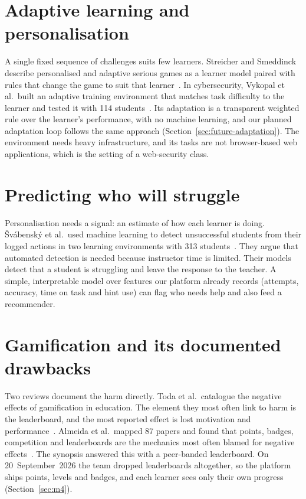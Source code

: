 \section{Adaptive learning and personalisation}

A single fixed sequence of challenges suits few learners. Streicher and Smeddinck describe personalised and adaptive serious games as a learner model paired with rules that change the game to suit that learner~\cite{Streicher2016adaptive}. In cybersecurity, Vykopal et al.\ built an adaptive training environment that matches task difficulty to the learner and tested it with 114 students~\cite{Vykopal2023smart}. Its adaptation is a transparent weighted rule over the learner's performance, with no machine learning, and our planned adaptation loop follows the same approach (Section~\ref{sec:future-adaptation}). The environment needs heavy infrastructure, and its tasks are not browser-based web applications, which is the setting of a web-security class.

\section{Predicting who will struggle}

Personalisation needs a signal: an estimate of how each learner is doing. Švábenský et al.\ used machine learning to detect unsuccessful students from their logged actions in two learning environments with 313 students~\cite{Svabensky2024detecting}. They argue that automated detection is needed because instructor time is limited. Their models detect that a student is struggling and leave the response to the teacher. A simple, interpretable model over features our platform already records (attempts, accuracy, time on task and hint use) can flag who needs help and also feed a recommender.

\section{Gamification and its documented drawbacks}

Two reviews document the harm directly. Toda et al.\ catalogue the negative effects of gamification in education. The element they most often link to harm is the leaderboard, and the most reported effect is lost motivation and performance~\cite{Toda2018dark}. Almeida et al.\ mapped 87 papers and found that points, badges, competition and leaderboards are the mechanics most often blamed for negative effects~\cite{Almeida2023negative}. The synopsis answered this with a peer-banded leaderboard. On 20~September~2026 the team dropped leaderboards altogether, so the platform ships points, levels and badges, and each learner sees only their own progress (Section~\ref{sec:m4}).

